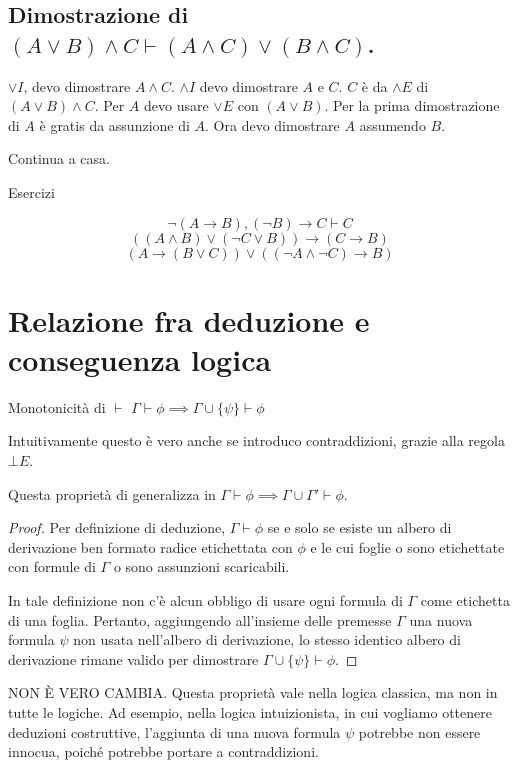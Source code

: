 \subsection*{Dimostrazione di \((A \lor B) \land C \vdash (A \land C) \lor (B \land C)\).}

\(\lor I\), devo dimostrare \(A \land C\).
\(\land I\) devo dimostrare \(A\) e \(C\).
\(C\) è da \(\land E\) di \((A \lor B)\land C\). Per \(A\) devo usare \(\lor E\) con \((A \lor B)\). Per la prima dimostrazione di \(A\) è gratis da assunzione di \(A\).
Ora devo dimostrare \(A\) assumendo \(B\).

Continua a casa.

Esercizi

\[\neg (A \to B), (\neg B) \to C \vdash C\]
\[((A\land B)\lor (\neg C \lor B))\to (C \to B)\]
\[(A \to (B\lor C))\lor((\neg A \land \neg C)\to B)\]

\section{Relazione fra deduzione e conseguenza logica}

\begin{theorem}{Monotonicità di \(\vdash\)}
  \(\Gamma \vdash \phi \implies \Gamma \cup \{\psi\} \vdash \phi\)
\end{theorem}

Intuitivamente questo è vero anche se introduco contraddizioni, grazie alla regola \(\bot E\).

\begin{note}{}
  Questa proprietà di generalizza in \(\Gamma \vdash \phi \implies \Gamma \cup \Gamma' \vdash \phi\).
\end{note}

\begin{proof}
  Per definizione di deduzione, \(\Gamma \vdash \phi\) se e solo se esiste un albero di derivazione ben formato radice etichettata con \(\phi\) e le cui foglie o sono etichettate con formule di \(\Gamma\) o sono assunzioni scaricabili. 

  In tale definizione non c'è alcun obbligo di usare ogni formula di \(\Gamma\) come etichetta di una foglia. Pertanto, aggiungendo all'insieme delle premesse \(\Gamma\) una nuova formula \(\psi\) non usata nell'albero di derivazione, lo stesso identico albero di derivazione rimane valido per dimostrare \(\Gamma \cup \{\psi\} \vdash \phi\).
\end{proof}

\begin{note}{}
  NON È VERO CAMBIA.
  Questa proprietà vale nella logica classica, ma non in tutte le logiche. Ad esempio, nella logica intuizionista, in cui vogliamo ottenere deduzioni costruttive, l'aggiunta di una nuova formula \(\psi\) potrebbe non essere innocua, poiché potrebbe portare a contraddizioni.
\end{note}

